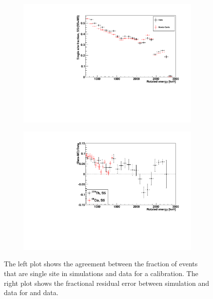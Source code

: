 \documentclass[herrin-thesis.tex]{subfiles}
\begin{document}
\begin{figure}[htb]
\centering
	\begin{subfigure}[b]{0.48\textwidth}
	\centering
	\includegraphics[width=\textwidth]{./plots/analysis_ssfrac_agreement.pdf}
	\end{subfigure}\hfill%
	\begin{subfigure}[b]{0.48\textwidth}
	\centering
	\includegraphics[width=\textwidth]{./plots/analysis_ssfrac_residuals.pdf}
	\end{subfigure}
\caption[Single site fraction agreement between simulation and data]{The left plot shows the agreement between the fraction of events that are single site in simulations and data for a  calibration. The right plot shows the fractional residual error between simulation and data for  and  data.}
\label{fig:analysis_ssfrac_agreement}
\end{figure}
\end{document}
